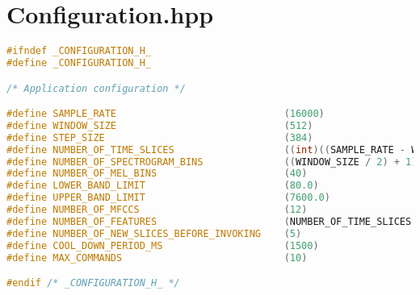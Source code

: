 \chapter{Configuration.hpp}
\label{add:config}


\begin{lstlisting}[language=C++, label=code:conf]
#ifndef _CONFIGURATION_H_
#define _CONFIGURATION_H_

/* Application configuration */

#define SAMPLE_RATE                             (16000)
#define WINDOW_SIZE                             (512)
#define STEP_SIZE                               (384)
#define NUMBER_OF_TIME_SLICES                   ((int)((SAMPLE_RATE - WINDOW_SIZE) / STEP_SIZE) + 1)
#define NUMBER_OF_SPECTROGRAM_BINS              ((WINDOW_SIZE / 2) + 1)
#define NUMBER_OF_MEL_BINS                      (40)
#define LOWER_BAND_LIMIT                        (80.0)
#define UPPER_BAND_LIMIT                        (7600.0)
#define NUMBER_OF_MFCCS                         (12)
#define NUMBER_OF_FEATURES                      (NUMBER_OF_TIME_SLICES * NUMBER_OF_MFCCS)
#define NUMBER_OF_NEW_SLICES_BEFORE_INVOKING    (5)
#define COOL_DOWN_PERIOD_MS                     (1500)
#define MAX_COMMANDS                            (10)

#endif /* _CONFIGURATION_H_ */

\end{lstlisting}